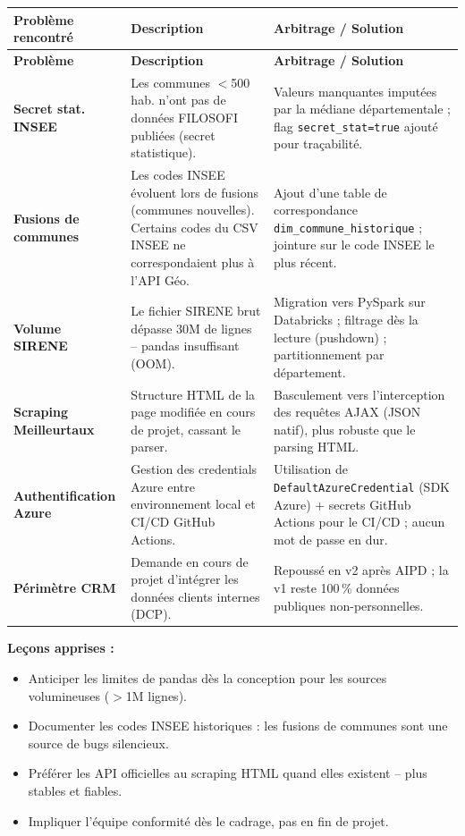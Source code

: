 \documentclass[11pt,a4paper]{article}
\begin{document}
\begin{longtable}{L{3cm} L{5.5cm} L{5cm}}
  \toprule
  \textbf{Problème rencontré} & \textbf{Description} & \textbf{Arbitrage / Solution} \\
  \midrule
  \endfirsthead
  \toprule
  \textbf{Problème} & \textbf{Description} & \textbf{Arbitrage / Solution} \\
  \midrule
  \endhead
  \bottomrule
  \endfoot

  \textbf{Secret stat. INSEE} & Les communes $<$500 hab. n'ont pas de données FILOSOFI publiées (secret statistique). & Valeurs manquantes imputées par la médiane départementale ; flag \texttt{secret\_stat=true} ajouté pour traçabilité. \\[0.5em]

  \textbf{Fusions de communes} & Les codes INSEE évoluent lors de fusions (communes nouvelles). Certains codes du CSV INSEE ne correspondaient plus à l'API Géo. & Ajout d'une table de correspondance \texttt{dim\_commune\_historique} ; jointure sur le code INSEE le plus récent. \\[0.5em]

  \textbf{Volume SIRENE} & Le fichier SIRENE brut dépasse 30M de lignes -- pandas insuffisant (OOM). & Migration vers PySpark sur Databricks ; filtrage dès la lecture (pushdown) ; partitionnement par département. \\[0.5em]

  \textbf{Scraping Meilleurtaux} & Structure HTML de la page modifiée en cours de projet, cassant le parser. & Basculement vers l'interception des requêtes AJAX (JSON natif), plus robuste que le parsing HTML. \\[0.5em]

  \textbf{Authentification Azure} & Gestion des credentials Azure entre environnement local et CI/CD GitHub Actions. & Utilisation de \texttt{DefaultAzureCredential} (SDK Azure) + secrets GitHub Actions pour le CI/CD ; aucun mot de passe en dur. \\[0.5em]

  \textbf{Périmètre CRM} & Demande en cours de projet d'intégrer les données clients internes (DCP). & Repoussé en v2 après AIPD ; la v1 reste 100\,\% données publiques non-personnelles. \\

\end{longtable}

\textbf{Leçons apprises :}
\begin{itemize}
  \item Anticiper les limites de pandas dès la conception pour les sources volumineuses ($>$1M lignes).
  \item Documenter les codes INSEE historiques : les fusions de communes sont une source de bugs silencieux.
  \item Préférer les API officielles au scraping HTML quand elles existent -- plus stables et fiables.
  \item Impliquer l'équipe conformité dès le cadrage, pas en fin de projet.
\end{itemize}
\end{document}
